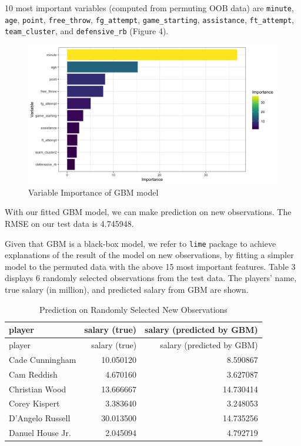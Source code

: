 \documentclass[
]{article}
\begin{document}
10 most important variables (computed from permuting OOB data) are
\texttt{minute}, \texttt{age}, \texttt{point}, \texttt{free\_throw},
\texttt{fg\_attempt}, \texttt{game\_starting}, \texttt{assistance},
\texttt{ft\_attempt}, \texttt{team\_cluster}, and \texttt{defensive\_rb}
(Figure 4).

\begin{figure}
\centering
\includegraphics{report_figures/figure_tree_3.png}
\caption{Variable Importance of GBM model}
\end{figure}

With our fitted GBM model, we can make prediction on new observations.
The RMSE on our test data is 4.745948.

Given that GBM is a black-box model, we refer to \texttt{lime} package
to achieve explanations of the result of the model on new observations,
by fitting a simpler model to the permuted data with the above 15 most
important features. Table 3 displays 6 randomly selected observations
from the test data. The players' name, true salary (in million), and
predicted salary from GBM are shown.

\begin{longtable}[]{@{}lrr@{}}
\caption{Prediction on Randomly Selected New
Observations}\tabularnewline
\toprule
player & salary (true) & salary (predicted by GBM) \\
\midrule
\endfirsthead
\toprule
player & salary (true) & salary (predicted by GBM) \\
\midrule
\endhead
Cade Cunningham & 10.050120 & 8.590867 \\
Cam Reddish & 4.670160 & 3.627087 \\
Christian Wood & 13.666667 & 14.730414 \\
Corey Kispert & 3.383640 & 3.248053 \\
D'Angelo Russell & 30.013500 & 14.735256 \\
Danuel House Jr. & 2.045094 & 4.792719 \\
\bottomrule
\end{longtable}
\end{document}
